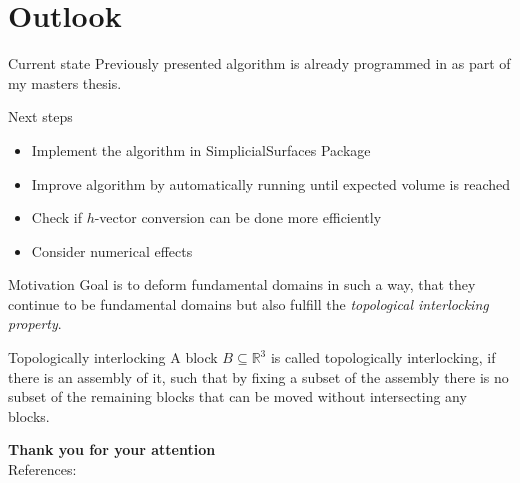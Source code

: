 \documentclass{beamer}
\theoremstyle{plain}
\newcommand\R{\mathbb R}
\begin{document}
\section{Outlook}
\begin{frame}
    \begin{exampleblock}{Current state}
        Previously presented algorithm is already programmed in as part of my masters thesis.
    \end{exampleblock}\pause
    \begin{block}{Next steps}
        \begin{itemize}[label={-}]
            \item Implement the algorithm in SimplicialSurfaces Package \pause
            \item Improve algorithm by automatically running until expected volume is reached \pause
            \item Check if $h$-vector conversion can be done more efficiently \pause
            \item Consider numerical effects \pause
        \end{itemize}
    \end{block}
    
\end{frame}

\begin{frame}
    \begin{exampleblock}{Motivation}
        Goal is to deform fundamental domains in such a way, that they continue to be fundamental domains but also fulfill the \emph{topological interlocking property}.
    \end{exampleblock}\pause
    \begin{definition}{Topologically interlocking}
        A block $B \subseteq \R^3$ is called topologically interlocking, if there is an assembly of it, such that by fixing a subset of the assembly there is no subset of the remaining blocks that can be moved without intersecting any blocks.
    \end{definition}
\end{frame}

\begin{frame}
    \textbf{\Large Thank you for your attention}\\ 
    \bigskip
    References:\\
    \printbibliography
\end{frame}
\end{document}
